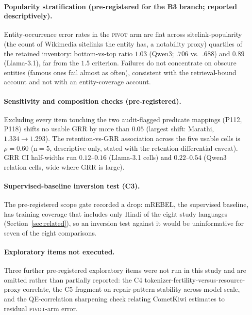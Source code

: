 \documentclass{llncs}
\begin{document}
\paragraph{Popularity stratification (pre-registered for the B3 branch;
reported descriptively).} Entity-occurrence error rates in the \textsc{pivot}
arm are flat across sitelink-popularity (the count of Wikimedia sitelinks
the entity has, a notability proxy) quartiles of the retained inventory:
bottom-vs-top ratio $1.03$ (Qwen3; $.706$ vs.\ $.688$) and $0.89$
(Llama-3.1), far from the $1.5$ criterion. Failures do not concentrate on
obscure entities (famous ones fail almost as often), consistent with the
retrieval-bound account and not with an entity-coverage account.

\paragraph{Sensitivity and composition checks (pre-registered).} Excluding
every item touching the two audit-flagged predicate mappings
(P112, P118) shifts no usable GRR by more than $0.05$ (largest shift:
Marathi, $1.334 \to 1.293$). The retention-vs-GRR association across the
five usable cells is $\rho = 0.60$ (n$=5$, descriptive only, stated with the
retention-differential caveat). GRR CI half-widths run $0.12$--$0.16$
(Llama-3.1 cells) and $0.22$--$0.54$ (Qwen3 relation cells, wide where GRR is
large).

\paragraph{Supervised-baseline inversion test (C3).} The pre-registered scope
gate recorded a drop: mREBEL, the supervised baseline, has training coverage
that includes only Hindi of the eight study languages
(Section~\ref{sec:related}), so an inversion test against it would be
uninformative for seven of the eight comparisons.

\paragraph{Exploratory items not executed.} Three further pre-registered
exploratory items were not run in this study and are omitted rather than
partially reported: the C4 tokenizer-fertility-versus-resource-proxy
correlate, the C5 fragment on repair-pattern stability across model scale,
and the QE-correlation sharpening check relating CometKiwi estimates to
residual \textsc{pivot}-arm error.
\end{document}
